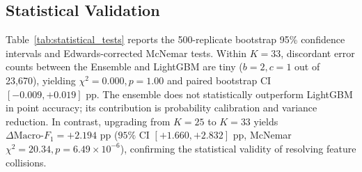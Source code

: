\documentclass[10pt,journal,twocolumn]{IEEEtran}
\begin{document}
\subsection{Statistical Validation}
Table~\ref{tab:statistical_tests} reports the 500-replicate bootstrap 95\% confidence intervals and Edwards-corrected McNemar tests. Within $K=33$, discordant error counts between the Ensemble and LightGBM are tiny ($b=2, c=1$ out of 23,670), yielding $\chi^2 = 0.000, p = 1.00$ and paired bootstrap CI $[-0.009, +0.019]\text{ pp}$. The ensemble does not statistically outperform LightGBM in point accuracy; its contribution is probability calibration and variance reduction. In contrast, upgrading from $K=25$ to $K=33$ yields $\Delta\text{Macro-}F_1 = +2.194\text{ pp}$ ($95\%$ CI $[+1.660, +2.832]\text{ pp}$, McNemar $\chi^2=20.34, p=6.49\times 10^{-6}$), confirming the statistical validity of resolving feature collisions.
\end{document}
